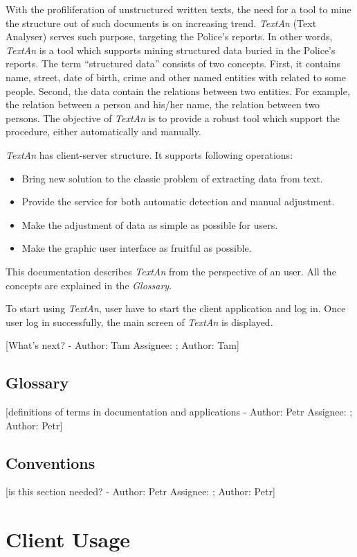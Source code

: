 \documentclass[12pt,a4paper]{report}
\makeatletter
\newcommand{\comment}[3][\@empty]{
  {\color{magenta}[#3 - }
  {\color{green}\ifx\@empty#1\relax Author: #2 \else Assignee: #1; Author: #2\fi}{\color{magenta}]}
}
\newcommand{\textan}{\emph{TextAn}}
\makeatother
\begin{document}
With the profiliferation of unstructured written texts, the need for a tool to mine the structure out of such documents is on increasing trend. 
\textan{} (Text Analyser) serves such purpose, targeting the Police's reports. 
In other words, \textan{} is a tool which supports mining structured data buried in the Police's reports. The term ``structured data'' consists of two concepts. 
First, it contains name, street, date of birth, crime and other named entities with related to some people. 
Second, the data contain the relations between two entities. 
For example, the relation between a person and his/her name, the relation between two persons. The objective of \textan{} is to provide a robust tool which support the procedure, either automatically and manually.

\textan{} has client-server structure. It supports following operations:
  
  \begin{itemize}
  \item Bring new solution to the classic problem of extracting data from text.
  \item Provide the service for both automatic detection and manual adjustment.
  \item Make the adjustment of data as simple as possible for users.
  \item Make the graphic user interface as fruitful as possible.
  \end{itemize}

This documentation describes \textan{} from the perspective of an user. 
All the concepts are explained in the \emph{Glossary}.

To start using \textan{}, user have to start the client application and log in. 
Once user log in successfully, the main screen of \textan{} is displayed.

\comment{Tam}{What's next?} 

\subsection{Glossary}

\comment{Petr}{definitions of terms in documentation and applications}

\subsection{Conventions}
\comment{Petr}{is this section needed?}

\section{Client Usage}
\end{document}
